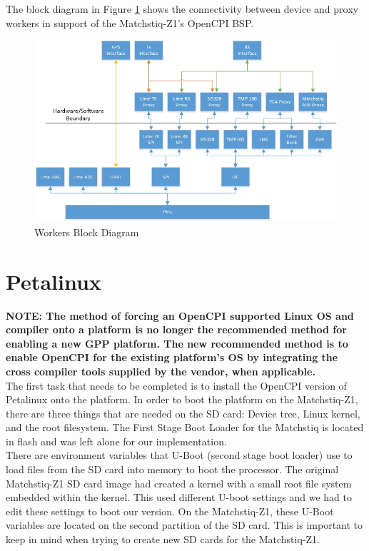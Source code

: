 \pagebreak
\noindent The block diagram in Figure \ref{fig:workerlevel} shows the connectivity between device and proxy workers in support of the Matchstiq-Z1's OpenCPI BSP.
    \begin{figure}[H]
      \centerline{\includegraphics[scale=0.65]{matchstiq_BSP_worker}}
      \caption{Workers Block Diagram}
      \label{fig:workerlevel}
    \end{figure}

\section{Petalinux}
  \textbf{NOTE: The method of forcing an OpenCPI supported Linux OS and compiler onto a platform is no longer the recommended method for enabling a new GPP platform. The new recommended method is to enable OpenCPI for the existing platform's OS by integrating the cross compiler tools supplied by the vendor, when applicable.} \\

\noindent The first task that needs to be completed is to install the OpenCPI version of Petalinux onto the platform.  In order to boot the platform on the Matchstiq-Z1, there are three things that are needed on the SD card: Device tree, Linux kernel, and the root filesystem.  The First Stage Boot Loader for the Matchstiq is located in flash and was left alone for our implementation.\\

\noindent There are environment variables that U-Boot (second stage boot loader) use to load files from the SD card into memory to boot the processor.  The original Matchstiq-Z1 SD card image had created a kernel with a small root file system embedded within the kernel. This used different U-boot settings and we had to edit these settings to boot our version. On the Matchstiq-Z1, these U-Boot variables are located on the second partition of the SD card. This is important to keep in mind when trying to create new SD cards for the Matchstiq-Z1. \\

